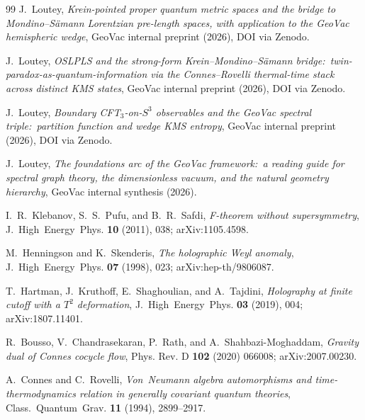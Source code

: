 \documentclass[11pt,a4paper]{article}
\theoremstyle{plain}
\theoremstyle{definition}
\newcommand{\sthree}{S^{3}}
\begin{document}
\begin{thebibliography}{99}
J.~Loutey,
\newblock \emph{Krein-pointed proper quantum metric spaces and the
bridge to Mondino--S\"amann Lorentzian pre-length spaces, with
application to the GeoVac hemispheric wedge},
\newblock GeoVac internal preprint (2026), DOI via Zenodo.

J.~Loutey,
\newblock \emph{OSLPLS and the strong-form Krein--Mondino--S\"amann
bridge:\ twin-paradox-as-quantum-information via the Connes--Rovelli
thermal-time stack across distinct KMS states},
\newblock GeoVac internal preprint (2026), DOI via Zenodo.

J.~Loutey,
\newblock \emph{Boundary CFT$_{3}$-on-$\sthree$ observables and the
GeoVac spectral triple:\ partition function and wedge KMS entropy},
\newblock GeoVac internal preprint (2026), DOI via Zenodo.

J.~Loutey,
\newblock \emph{The foundations arc of the GeoVac framework:\ a
reading guide for spectral graph theory, the dimensionless vacuum,
and the natural geometry hierarchy},
\newblock GeoVac internal synthesis (2026).

I.~R.~Klebanov, S.~S.~Pufu, and B.~R.~Safdi,
\newblock \emph{F-theorem without supersymmetry},
\newblock J.~High~Energy~Phys. \textbf{10} (2011), 038;
\newblock arXiv:1105.4598.

M.~Henningson and K.~Skenderis,
\newblock \emph{The holographic Weyl anomaly},
\newblock J.~High~Energy~Phys. \textbf{07} (1998), 023;
\newblock arXiv:hep-th/9806087.

T.~Hartman, J.~Kruthoff, E.~Shaghoulian, and A.~Tajdini,
\newblock \emph{Holography at finite cutoff with a $T^{2}$
deformation},
\newblock J.~High~Energy~Phys. \textbf{03} (2019), 004;
\newblock arXiv:1807.11401.

R.~Bousso, V.~Chandrasekaran, P.~Rath, and A.~Shahbazi-Moghaddam,
\newblock \emph{Gravity dual of Connes cocycle flow},
\newblock Phys. Rev. D \textbf{102} (2020) 066008; arXiv:2007.00230.

A.~Connes and C.~Rovelli,
\newblock \emph{Von~Neumann algebra automorphisms and time-
thermodynamics relation in generally covariant quantum theories},
\newblock Class.~Quantum~Grav. \textbf{11} (1994), 2899--2917.


\end{thebibliography}
\end{document}
